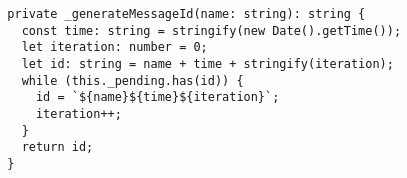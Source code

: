 \begin{verbatim}
  private _generateMessageId(name: string): string {
    const time: string = stringify(new Date().getTime());
    let iteration: number = 0;
    let id: string = name + time + stringify(iteration);
    while (this._pending.has(id)) {
      id = `${name}${time}${iteration}`;
      iteration++;
    }
    return id;
  }
\end{verbatim}
